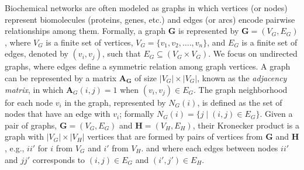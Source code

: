 \documentclass[10pt, journal, compsoc, final]{IEEEtran}
\newcommand{\bs}[1]{\boldsymbol{#1}}
\newcommand{\Matrix}[1]{\mathbf{#1}}
\newcommand{\Graph}[1]{\mathit{\mathbf{\bs{#1}}}}
\newcommand{\Set}[1]{\mathit{#1}}
\newcommand{\where}{\mid}
\begin{document}
Biochemical networks are often modeled as graphs in which vertices (or nodes) represent
biomolecules (proteins, genes, etc.) and edges (or arcs) encode pairwise relationships among
them. Formally, a graph $\Graph{G}$ is represented by $\Graph{G} = (\Set{V_G}, \Set{E_G})$,
where $\Set{V_G}$ is a finite set of vertices, $\Set{V_G} = \{v_1, v_2, \ldots., v_n\}$, and
$\Set{E_G}$ is a finite set of edges, denoted by $(v_i, v_j)$, such that $\Set{E_G} \subseteq
(\Set{V_G} \times \Set{V_G})$. We focus on undirected graphs, where edges define a 
symmetric relation among graph vertices.
A graph can be represented by a matrix $\Matrix{A}_\Graph{G}$ of size $|\Set{V_G}|\times|\Set{V_G}|$,
known as the \textit{adjacency matrix}, in which $\Matrix{A}_G(i, j) = 1$ when $(v_i, v_j) \in
\Set{E_G}$. The graph neighborhood for each node $v_i$ in the graph, represented by $\Set{N}_G(i)$,
is defined as the set of nodes that have an edge with $v_i$; formally $\Set{N}_G(i) = \{j \where (i, j)
\in \Set{E_G} \}$. Given a pair of graphs, $\Graph{G} = (\Set{V_G}, \Set{E_G})$ and
$\Graph{H} = (\Set{V_H}, \Set{E_H})$, their Kronecker product is a graph with $|V_G| \times |V_H|$
vertices that are formed by pairs of vertices from $\Graph{G}$ and $\Graph{H}$, e.g., $ii'$ for $i$ from $\Set{V_G}$ and $i'$ from $\Set{V_H}$. and where each edges between nodes $ii'$ and $jj'$ corresponds to $(i, j) \in E_G$ and
$(i', j') \in E_H$.
\end{document}
